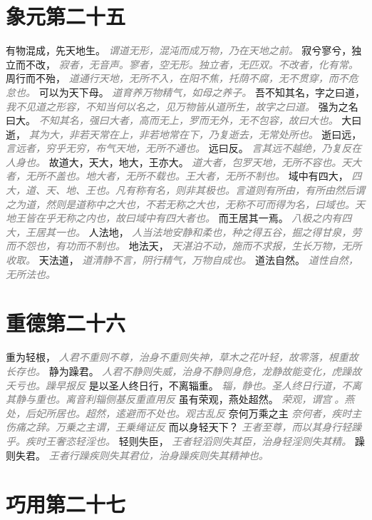 \documentclass[a4paper,zihao=-4,oneside,landscape,UTF8]{ctexart}
\newcommand{\zhushi}[1]{\scriptsize{\textit{\textcolor{gray}{#1}}}\normalsize}
\begin{document}
\section{象元第二十五}

有物混成，先天地生。
\zhushi{谓道无形，混沌而成万物，乃在天地之前。}
寂兮寥兮，独立而不改，
\zhushi{寂者，无音声。寥者，空无形。独立者，无匹双。不改者，化有常。}
周行而不殆，
\zhushi{道通行天地，无所不入，在阳不焦，托荫不腐，无不贯穿，而不危怠也。}
可以为天下母。
\zhushi{道育养万物精气，如母之养子。}
吾不知其名，字之曰道，
\zhushi{我不见道之形容，不知当何以名之，见万物皆从道所生，故字之曰道。}
强为之名曰大。
\zhushi{不知其名，强曰大者，高而无上，罗而无外，无不包容，故曰大也。}
大曰逝，
\zhushi{其为大，非若天常在上，非若地常在下，乃复逝去，无常处所也。}
逝曰远，
\zhushi{言远者，穷乎无穷，布气天地，无所不通也。}
远曰反。
\zhushi{言其远不越绝，乃复反在人身也。}
故道大，天大，地大，王亦大。
\zhushi{道大者，包罗天地，无所不容也。天大者，无所不盖也。地大者，无所不载也。王大者，无所不制也。}
域中有四大，
\zhushi{四大，道、天、地、王也。凡有称有名，则非其极也。言道则有所由，有所由然后谓之为道，然则是道称中之大也，不若无称之大也，无称不可而得为名，曰域也。天地王皆在乎无称之内也，故曰域中有四大者也。}
而王居其一焉。
\zhushi{八极之内有四大，王居其一也。}
人法地，
\zhushi{人当法地安静和柔也，种之得五谷，掘之得甘泉，劳而不怨也，有功而不制也。}
地法天，
\zhushi{天湛泊不动，施而不求报，生长万物，无所收取。}
天法道，
\zhushi{道清静不言，阴行精气，万物自成也。}
道法自然。
\zhushi{道性自然，无所法也。}


\section{重德第二十六}

重为轻根，
\zhushi{人君不重则不尊，治身不重则失神，草木之花叶轻，故零落，根重故长存也。}
静为躁君。
\zhushi{人君不静则失威，治身不静则身危，龙静故能变化，虎躁故夭亏也。躁早报反}
是以圣人终日行，不离辎重。
\zhushi{辎，静也。圣人终日行道，不离其静与重也。离音利辎侧基反重直用反}
虽有荣观，燕处超然。
\zhushi{荣观，谓宫𨵗。燕处，后妃所居也。超然，逺避而不处也。观古乱反}
奈何万乘之主
\zhushi{奈何者，疾时主伤痛之辞。万乗之主谓，王乗绳证反}
而以身轻天下？
\zhushi{王者至尊，而以其身行轻躁乎。疾时王奢恣轻淫也。}
轻则失臣，
\zhushi{王者轻滔则失其臣，治身轻淫则失其精。}
躁则失君。
\zhushi{王者行躁疾则失其君位，治身躁疾则失其精神也。}


\section{巧用第二十七}
\end{document}

